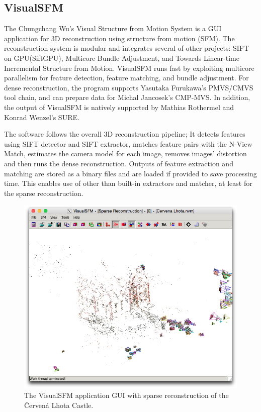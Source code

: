 \subsection*{VisualSFM}
The Chungchang Wu's Visual Structure from Motion System is a GUI application for 3D reconstruction using structure from motion (SFM). The reconstruction system is modular and integrates several of other projects: SIFT on GPU(SiftGPU), Multicore Bundle Adjustment, and Towards Linear-time Incremental Structure from Motion. VisualSFM runs fast by exploiting multicore parallelism for feature detection, feature matching, and bundle adjustment. For dense reconstruction, the program supports Yasutaka Furukawa's PMVS/CMVS tool chain, and can prepare data for Michal Jancosek's CMP-MVS. In addition, the output of VisualSFM is natively supported by Mathias Rothermel and Konrad Wenzel's SURE.

The software follows the overall 3D reconstruction pipeline; It detects features using SIFT detector and SIFT extractor, matches feature pairs with the N-View Match, estimates the camera model for each image, removes images' distortion and then runs the dense reconstruction. Outputs of feature extraction and matching are stored as a binary files and are loaded if provided to save processing time. This enables use of other than built-in extractors and matcher, at least for the sparse reconstruction. \cite{www:visual_sfm}

\begin{figure}[ht]
	\begin{center}
		\includegraphics[keepaspectratio,width=14cm]{fig/VisualSFM.png}
	\end{center}
	\caption{The VisualSFM application GUI with sparse reconstruction of the Červená Lhota Castle.}
	\label{fig:visualsfm}
\end{figure}

